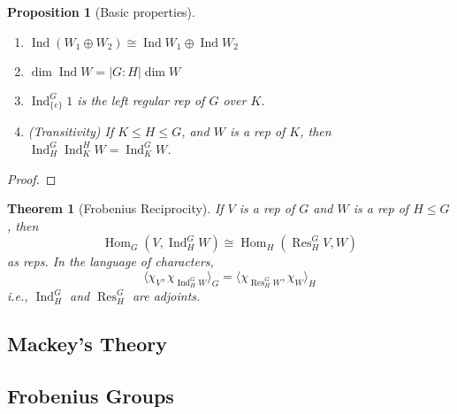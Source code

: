 \documentclass{article}
\theoremstyle{definition}
\theoremstyle{remark}
\theoremstyle{plain}
\newtheorem{thm}[defn]{Theorem}
\newtheorem{prop}[defn]{Proposition}
\newcommand{\Hom}{\operatorname{Hom}}
\begin{document}
\begin{prop}[Basic properties]
    \begin{enumerate}
        \item $\operatorname{Ind}(W_1\oplus W_2)\cong \operatorname{Ind}W_1\oplus\operatorname{Ind}W_2$
        \item $\dim\operatorname{Ind}W=|G:H|\dim W$
        \item $\operatorname{Ind}_{\{e\}}^G1$ is the left regular rep of $G$ over $K$.
        \item (Transitivity) If $K\le H\le G$, and $W$ is a rep of $K$, then $\operatorname{Ind}_H^G\operatorname{Ind}_K^HW=\operatorname{Ind}_K^GW$.
    \end{enumerate}
\end{prop}
\begin{proof}
    
\end{proof}


\begin{thm}[Frobenius Reciprocity]
    If $V$ is a rep of $G$ and $W$ is a rep of $H\le G$, then
    \[\Hom_G(V,\operatorname{Ind}_H^GW)\cong\Hom_H(\operatorname{Res}^G_HV,W)\]
    as reps. In the language of characters,
    \[\langle\chi_V,\chi_{\operatorname{Ind}_H^GW}\rangle_G=\langle\chi_{\operatorname{Res}^G_HW},\chi_W\rangle_H\]
    i.e., $\operatorname{Ind}_H^G$ and $\operatorname{Res}^G_H$ are adjoints.
\end{thm}

\subsection{Mackey's Theory}

\subsection{Frobenius Groups}
\end{document}
